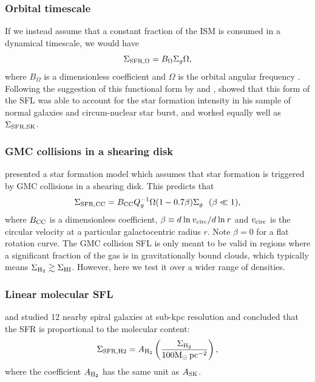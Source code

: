 \documentclass[12pt,preprint]{aastex}
\begin{document}
\subsubsection{Orbital timescale}
If we instead assume that a constant fraction of the ISM is consumed in a dynamical timescale, 
we would have \begin{equation}
\Sigma_{\rm SFR,\Omega}=B_{\Omega}\Sigma_g \Omega,
\end{equation} 
where $B_{\Omega}$ is a dimensionless coefficient and $\Omega$ is the orbital angular frequency \citep{ler08, tan10}. Following the suggestion of this functional form by \citet{silk97} and \citet{elm97}, \citet{ken98} showed that this form of the SFL was able to account for the star formation intensity in his sample of normal galaxies and circum-nuclear star burst, and worked equally well as $\Sigma_{\rm SFR,SK}$.


\subsubsection{GMC collisions in a shearing disk}
\label{sfl_cc}
\citet{tan00} presented a star formation model which assumes that star formation is triggered by GMC collisions in a shearing disk. This predicts that
\begin{equation}
\label{sfrcoll}
\Sigma_{\rm SFR,CC} = B_{\rm CC} Q_g^{-1}  \Omega (1 - 0.7 \beta) \Sigma_g \:\:\: (\beta \ll 1),
\end{equation}
where  $B_{\rm CC}$ is a dimensionless coefficient, $\beta\equiv d\:{\rm ln}\:v_{\rm circ} / d\:{\rm ln}\: r$ and 
$v_{\rm circ}$ is the circular velocity at a particular galactocentric
radius $r$. Note $\beta=0$ for a flat rotation curve. 
The GMC collision SFL is only meant to be valid in regions where a significant fraction of the gas is in gravitationally bound clouds, which typically means $  \Sigma_{\rm H_2} \gtrsim   \Sigma_{\rm HI}$. However, here we test it over a wider range of densities.



\subsubsection{Linear molecular SFL}
\label{sfl_h2}
\citet{ler08} and \citet{big08} studied 12 nearby spiral galaxies at sub-kpc resolution and concluded that the SFR is proportional to the molecular content: 
\begin{equation}
\Sigma_{\rm SFR,H2}=A_{\rm H_2}\left(\frac{\Sigma_{\rm H_2}}{\rm 100 M_{\odot}\, pc^{-2}}\right),
\end{equation}
where the coefficient $A_{\rm H_2}$ has the same unit as $A_{\rm SK}$.
\end{document}
